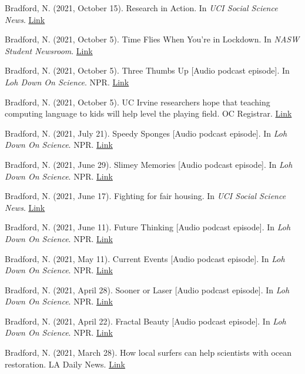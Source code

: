 \documentclass[margin, 10pt]{res} %
\begin{document}
\begin{resume}
Bradford, N. (2021, October 15). Research in Action. In {\sl UCI Social Science News}. \href{https://www.socsci.uci.edu/newsevents/news/2021/2021-10-15-gillooly.php}{Link} 

Bradford, N. (2021, October 5). Time Flies When You're in Lockdown. In {\sl NASW Student Newsroom}. \href{https://nasw.org/article/time-flies-when-youre-lockdown}{Link}

Bradford, N. (2021, October 5). Three Thumbs Up [Audio podcast episode]. In {\sl Loh Down On Science}. NPR. \href{https://lohdownonscience.com/three-thumbs-up/}{Link}

Bradford, N. (2021, October 5). UC Irvine researchers hope that teaching computing language to kids will help level the playing field. OC Registrar. \href{https://www.ocregister.com/2021/10/05/uc-irvine-researchers-hope-that-teaching-computing-language-to-kids-will-help-level-the-playing-field/}{Link}

Bradford, N. (2021, July 21). Speedy Sponges [Audio podcast episode]. In {\sl Loh Down On Science}. NPR. \href{https://lohdownonscience.com/speedy-sponges/}{Link}

Bradford, N. (2021, June 29). Slimey Memories [Audio podcast episode]. In {\sl Loh Down On Science}. NPR. \href{https://lohdownonscience.com/slimey-memories/}{Link}

Bradford, N. (2021, June 17). Fighting for fair housing. In {\sl UCI Social Science News}. \href{https://www.socsci.uci.edu/newsevents/news/2021/2021-06-17-schmidt-haynes-foundation.php}{Link}

Bradford, N. (2021, June 11). Future Thinking [Audio podcast episode]. In {\sl Loh Down On Science}. NPR. \href{https://lohdownonscience.com/future-thinking/}{Link} 

Bradford, N. (2021, May 11). Current Events [Audio podcast episode]. In {\sl Loh Down On Science}. NPR. \href{https://lohdownonscience.com/current-events/}{Link}

Bradford, N. (2021, April 28). Sooner or Laser [Audio podcast episode]. In {\sl Loh Down On Science}. NPR. \href{https://lohdownonscience.com/sooner-or-laser/}{Link}

Bradford, N. (2021, April 22). Fractal Beauty [Audio podcast episode]. In {\sl Loh Down On Science}. NPR. \href{https://lohdownonscience.com/fractal-beauty/}{Link}

Bradford, N. (2021, March 28). How local surfers can help scientists with ocean restoration. LA Daily News. \href{https://www.dailynews.com/2021/03/28/how-local-surfers-can-help-scientists-with-ocean-restoration/}{Link}


\end{resume}
\end{document}
